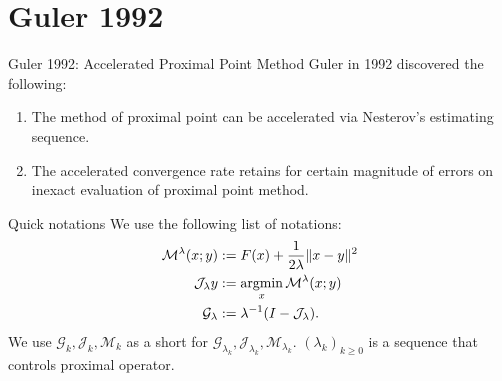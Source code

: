 \documentclass[11pt]{beamer}
\begin{document}
\section{Guler 1992}
    \begin{frame}{Guler 1992: Accelerated Proximal Point Method}
        Guler in 1992 discovered the following: 
        \begin{enumerate}
            \item The method of proximal point can be accelerated via Nesterov's estimating sequence. 
            \item The accelerated convergence rate retains for certain magnitude of errors on inexact evaluation of proximal point method. 
        \end{enumerate}
        \begin{block}{Quick notations}
            We use the following list of notations: 
            \begin{align*}
                \mathcal M^{\lambda} (x; y) &:= F(x) + \frac{1}{2\lambda}\Vert x - y\Vert^2
                \\
                \mathcal J_\lambda y &:= \mathop{\rm argmin}\limits_x \mathcal M^{\lambda} (x; y)
                \\
                \mathcal G_\lambda &:= \lambda^{-1}(I - \mathcal J_\lambda). 
            \end{align*}
            We use $\mathcal G_k, \mathcal J_k, \mathcal M_k$ as a short for $\mathcal G_{\lambda_k}, \mathcal J_{\lambda_k}, \mathcal M_{\lambda_k}$. 
            $(\lambda_k)_{k \ge0}$ is a sequence that controls proximal operator. 
        \end{block}
    \end{frame}
\end{document}
